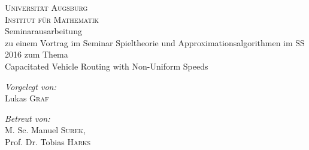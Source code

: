 \documentclass[a4paper,ngerman,12pt,bibtotoc]{scrartcl}
\theoremstyle{definition}
\theoremstyle{plain}
\theoremstyle{remark}
\begin{document}
	\author{Lukas Graf}
	\date{Letzte Aktualisierung: \today}
	
	\thispagestyle{empty}
	
	
	\begin{titlepage}\center
	\textsc{\LARGE Universität Augsburg}\\[1.5cm]
	
	\textsc{\Large Institut für Mathematik}\\[2.5cm]
	
	{\Large Seminar\glqq ausarbeitung\grqq \\[1cm]}
	zu einem Vortrag im Seminar Spieltheorie und Approximationsalgorithmen im SS 2016 zum Thema\\[1.5cm]
	{\huge Capacitated Vehicle Routing with Non-Uniform Speeds}
		
	
	\vfill
	
	\begin{minipage}{0.4\textwidth}
		\begin{flushleft} \large
			\emph{Vorgelegt von:}\\
			Lukas \textsc{Graf}
		\end{flushleft}
	\end{minipage}
	\begin{minipage}{0.4\textwidth}
		\begin{flushright} \large
			\emph{Betreut von:} \\
			M. Sc. Manuel \textsc{Surek},\\Prof. Dr. Tobias \textsc{Harks}
		\end{flushright}
	\end{minipage}
	
	\end{titlepage}

	\newpage
	\nocite{*}
	\printbibliography		
			
\end{document}
